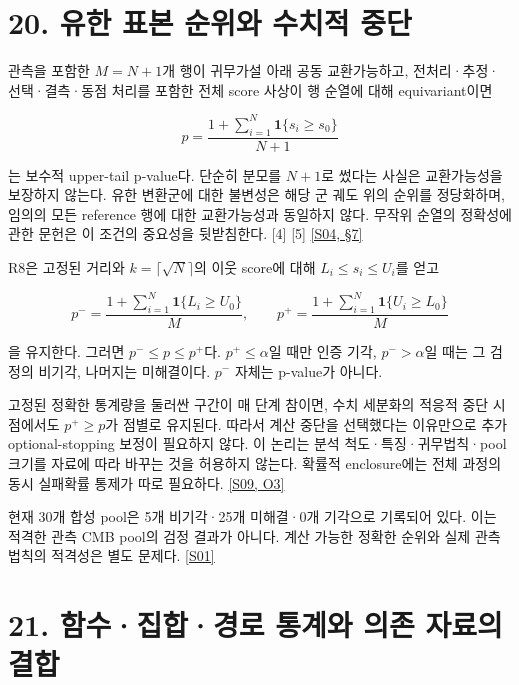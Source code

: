 \documentclass[11pt,a4paper]{article}
\begin{document}
\hypertarget{s20}{}

\section*{20. 유한 표본 순위와 수치적 중단}


관측을 포함한 \(M=N+1\)개 행이 귀무가설 아래 공동 교환가능하고, 전처리·추정·선택·결측·동점 처리를 포함한 전체 score 사상이 행 순열에 대해 equivariant이면


\[
p=\frac{1+\sum_{i=1}^N\mathbf1\{s_i\ge s_0\}}{N+1}
\]

는 보수적 upper-tail p-value다. 단순히 분모를 \(N+1\)로 썼다는 사실은 교환가능성을 보장하지 않는다. 유한 변환군에 대한 불변성은 해당 군 궤도 위의 순위를 정당화하며, 임의의 모든 reference 행에 대한 교환가능성과 동일하지 않다. 무작위 순열의 정확성에 관한 문헌은 이 조건의 중요성을 뒷받침한다. [4] [5] \hyperlink{src:S04}{[S04, §7]}


R8은 고정된 거리와 \(k=\lceil\sqrt N\rceil\)의 이웃 score에 대해 \(L_i\le s_i\le U_i\)를 얻고


\[
p^- =\frac{1+\sum_{i=1}^N\mathbf1\{L_i\ge U_0\}}M,
\qquad
p^+ =\frac{1+\sum_{i=1}^N\mathbf1\{U_i\ge L_0\}}M
\]

을 유지한다. 그러면 \(p^-\le p\le p^+\)다. \(p^+\le\alpha\)일 때만 인증 기각, \(p^->\alpha\)일 때는 그 검정의 비기각, 나머지는 미해결이다. \(p^-\) 자체는 p-value가 아니다.


고정된 정확한 통계량을 둘러싼 구간이 매 단계 참이면, 수치 세분화의 적응적 중단 시점에서도 \(p^+\ge p\)가 점별로 유지된다. 따라서 계산 중단을 선택했다는 이유만으로 추가 optional-stopping 보정이 필요하지 않다. 이 논리는 분석 척도·특징·귀무법칙·pool 크기를 자료에 따라 바꾸는 것을 허용하지 않는다. 확률적 enclosure에는 전체 과정의 동시 실패확률 통제가 따로 필요하다. \hyperlink{src:S09}{[S09, O3]}


현재 30개 합성 pool은 5개 비기각·25개 미해결·0개 기각으로 기록되어 있다. 이는 적격한 관측 CMB pool의 검정 결과가 아니다. 계산 가능한 정확한 순위와 실제 관측법칙의 적격성은 별도 문제다. \hyperlink{src:S01}{[S01]}


\hypertarget{s21}{}

\section*{21. 함수·집합·경로 통계와 의존 자료의 결합}

\end{document}
